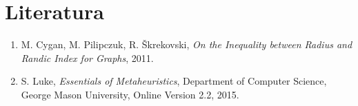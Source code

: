 \documentclass[a4paper, 10pt]{article}
\begin{document}
\pagebreak

\section{Literatura}
\vspace{0.5cm}

\renewcommand{\labelenumi}{[\arabic{enumi}]}
\begin{enumerate}
\item \noindent M. Cygan, M. Pilipczuk, R. Škrekovski, \textsl{On the Inequality between Radius and Randic Index for Graphs}, 2011. 
\vspace{0.5cm}
\item \noindent  S. Luke, \textsl{Essentials of Metaheuristics}, Department of Computer Science, George Mason University, Online Version 2.2, 2015.
\end{enumerate}
\end{document}
